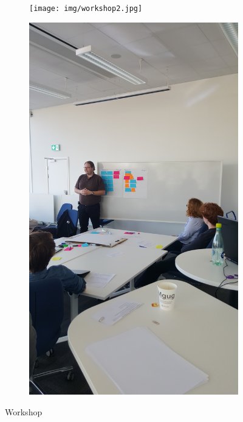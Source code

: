 \begin{figure}[ht]
    \begin{subfigure}{.32\textwidth}
        \centering
        \texttt{[image: img/workshop2.jpg]}
        \label{fig:workshop2}
    \end{subfigure}
    \begin{subfigure}{.32\textwidth}
        \centering
        \includegraphics[width=\textwidth, angle=270, origin=c]{img/workshop3.jpg}
        \label{fig:workshop3}
    \end{subfigure}
    \caption{Workshop}
\end{figure}
\vfill

